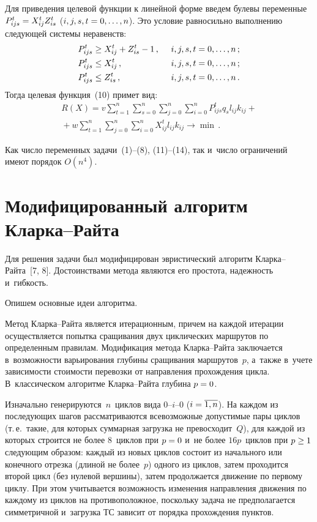 \begin{multicols}{2}
  Для приведения целевой функции к линейной форме введем булевы
переменные $P^t_{ijs} \hm= X_{ij}^t Z_{is}^t$ ($i,j,s,t\hm= 0,\ldots ,n$). Это
условие равносильно выполнению следующей системы неравенств:
  \begin{alignat}{2}
  P^t_{ijs} &\geq X_{ij}^t +Z_{is}^t -1\,, &\enskip i,j,s,t&=0,\ldots, n\,;\label{e11-br}\\
  P_{ijs}^t &\leq X_{ij}^t\,, &\enskip i,j,s,t&=0,\ldots ,n\,;\label{e12-br}\\
  P_{ijs}^t&\leq Z_{is}^t\,, &\enskip i,j,s,t&=0,\ldots, n\,.\label{e13-br}
  \end{alignat}
%
  Тогда целевая функция~(10) примет вид:
  \begin{multline}
  R(X) =v\sum\limits_{t=1}^n \sum\limits_{s=0}^n \sum\limits_{j=0}^n
\sum\limits_{i=0}^n P^t_{ijs} q_s l_{ij} k_{ij} +{}\\
{}+w \sum\limits_{t=1}^n
\sum\limits_{j=0}^n \sum\limits_{i=0}^n X_{ij}^t l_{ij} k_{ij}\to \min\,.
  \label{e14-br}
  \end{multline}

  Как число переменных задачи~(1)--(8), (11)--(14), так и~число ограничений
имеют порядок $O(n^4)$.

\section{Модифицированный алгоритм Кларка--Райта}

  Для решения задачи был модифицирован эвристический алгоритм
  Клар\-ка--Рай\-та~[7, 8]. Достоинствами метода являются его простота,
надежность и~гибкость.

  Опишем основные идеи алгоритма.

  Метод Кларка--Райта является итерационным, причем на каждой итерации
осуществляется попытка сращивания двух циклических маршрутов по
определенным правилам. Модификация метода Клар\-ка--Рай\-та заключается
в~возможности варьирования глубины сращивания маршрутов~$p$, а~также
в~учете зависимости стоимости перевозки от направления прохождения цикла.
В~классическом алгоритме Клар\-ка--Рай\-та глубина $p\hm=0$.

  Изначально генерируются~$n$~цик\-лов вида 0--$i$--0
($i\hm=\overline{1,n}$). На каждом из последующих шагов рассматриваются
всевозможные допустимые пары циклов (т.\,е.\ такие, для которых суммарная
загрузка не превосходит~$Q$), для каждой из которых строится не более
8~цик\-лов при $p\hm =0$ и~не более $16p$~цик\-лов при $p\hm\geq 1$
следующим образом: каждый из новых циклов состоит из начального или
конечного отрезка (длиной не более~$p$) одного из циклов, затем проходится
второй цикл (без нулевой вершины), затем продолжается движение по первому
циклу. При этом учитывается возможность изменения направления движения
по каждому из циклов на противоположное, поскольку задача не
предполагается симметричной и~загрузка ТС зависит от порядка прохождения
пунктов.


\end{multicols}
